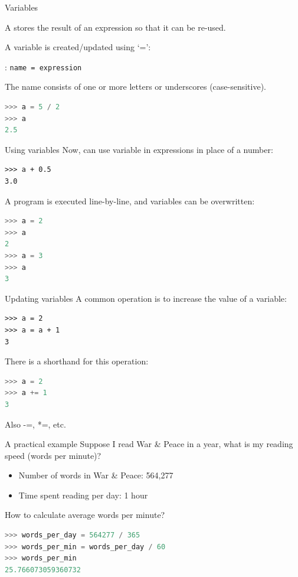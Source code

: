 \documentclass{beamer}
\begin{document}
\begin{frame}[fragile]{Variables}
    \begin{definition}
        A  stores the result of an expression
        so that it can be re-used.
    \end{definition}

A variable is created/updated using `=':

\begin{definition}
: \texttt{name = expression}

The name consists of one or more letters or underscores (case-sensitive).
\end{definition}

\begin{lstlisting}[language=python]
>>> a = 5 / 2
>>> a
2.5
\end{lstlisting}
\end{frame}

\begin{frame}[fragile]{Using variables}
Now, can use variable in expressions in place of a number:

\begin{lstlisting}
>>> a + 0.5
3.0
\end{lstlisting}

\pause
A program is executed line-by-line, and variables can be overwritten:
\begin{lstlisting}[language=python]
>>> a = 2
>>> a
2
>>> a = 3
>>> a
3
\end{lstlisting}
\end{frame}


\begin{frame}{Updating variables}
A common operation is to increase the value of a variable:
\begin{lstlisting}
>>> a = 2
>>> a = a + 1
3
\end{lstlisting}

\pause
There is a shorthand for this operation:
\begin{lstlisting}[language=python]
>>> a = 2
>>> a += 1
3
\end{lstlisting}

Also -=, *=, etc.
\end{frame}


\begin{frame}[fragile]{A practical example}
    Suppose I read War \& Peace in a year,
    what is my reading speed (words per minute)?
    \begin{itemize}
        \item Number of words in War \& Peace: 564,277
        \item Time spent reading per day: 1 hour
    \end{itemize}
    How to calculate average words per minute?
    \pause

\begin{lstlisting}[language=python]
>>> words_per_day = 564277 / 365
>>> words_per_min = words_per_day / 60
>>> words_per_min
25.766073059360732
\end{lstlisting}
\end{frame}
\end{document}
